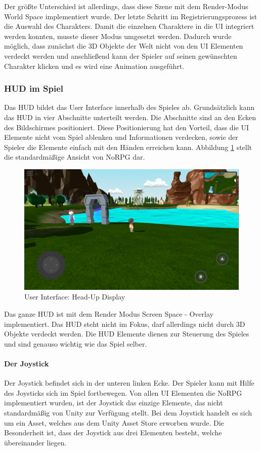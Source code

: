 				Der größte Unterschied ist allerdings, dass diese Szene mit dem Render-Modus World Space implementiert wurde. Der letzte Schritt im Registrierungsprozess ist die Auswahl des Charakters. Damit die einzelnen Charaktere in die \ac{UI} integriert werden konnten, musste dieser Modus umgesetzt werden. Dadurch wurde möglich, dass zunächst die 3D Objekte der Welt nicht von den \ac{UI} Elementen verdeckt werden und anschließend kann der Spieler auf seinen gewünschten Charakter klicken und es wird eine Animation ausgeführt. 

			\subsubsection{\acl{HUD} im Spiel}
				Das \ac{HUD} bildet das User Interface innerhalb des Spieles ab. Grundsätzlich kann das \ac{HUD} in vier Abschnitte unterteilt werden. Die Abschnitte sind an den Ecken des Bildschirmes positioniert. Diese Positionierung hat den Vorteil, dass die \ac{UI} Elemente nicht vom Spiel ablenken und Informationen verdecken, sowie der Spieler die Elemente einfach mit den Händen erreichen kann. Abbildung \ref{alwaysOnUI} stellt die standardmäßige Ansicht von NoRPG dar.

				\begin{figure}[htbp]
					\centering 
					\label{alwaysOnUI}
					\includegraphics[width=13cm]{pics/alwaysOnUI.png}
					\caption{User Interface: Head-Up Display}
				\end{figure}

				Das ganze \ac{HUD} ist mit dem Render Modus Screen Space - Overlay implementiert. Das \ac{HUD} steht nicht im Fokus, darf allerdings nicht durch 3D Objekte verdeckt werden. Die \ac{HUD} Elemente dienen zur Steuerung des Spieles und sind genauso wichtig wie das Spiel selber.

				\paragraph{Der Joystick}
					Der Joystick befindet sich in der unteren linken Ecke. Der Spieler kann mit Hilfe des Joysticks sich im Spiel fortbewegen. Von allen \ac{UI} Elementen die NoRPG implementiert wurden, ist der Joystick das einzige Elemente, das nicht standardmäßig von Unity zur Verfügung stellt. Bei dem Joystick handelt es sich um ein Asset, welches aus dem Unity Asset Store erworben wurde. Die Besonderheit ist, dass der Joystick aus drei Elementen besteht, welche übereinander liegen. 

